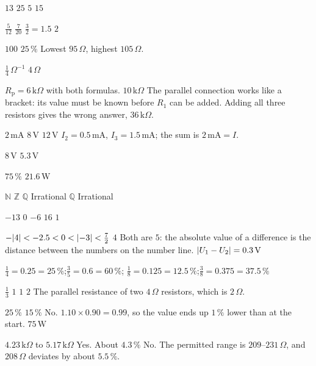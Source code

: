 
\begin{facit}

  $13$  $25$  $5$  $15$

  $\frac{5}{12}$  $\frac{7}{20}$  $\frac{3}{2} = 1.5$  $2$

  $100$  $25\,\%$  Lowest $95\,\Omega$, highest $105\,\Omega$.

  $\frac{1}{4}\,\Omega^{-1}$  $4\,\Omega$

  $R_{\text{p}} = 6\,\text{k}\Omega$ with both formulas.
 $10\,\text{k}\Omega$
 The parallel connection works like a bracket: its value must be known before $R_1$ can be
added. Adding all three resistors gives the wrong answer, $36\,\text{k}\Omega$.

  $2\,\text{mA}$  $8\,\text{V}$  $12\,\text{V}$
 $I_2 = 0.5\,\text{mA}$, $I_3 = 1.5\,\text{mA}$; the sum is $2\,\text{mA} = I$.

  $8\,\text{V}$  $5.3\,\text{V}$

  $75\,\%$  $21.6\,\text{W}$

  $\mathbb{N}$  $\mathbb{Z}$  $\mathbb{Q}$  Irrational
 $\mathbb{Q}$  Irrational

  $-13$  $0$  $-6$  $16$  $1$

  $-\lvert4\rvert < -2.5 < 0 < \lvert-3\rvert < \frac{7}{2}$  $4$
 Both are $5$: the absolute value of a difference is the distance between the numbers on the
number line.
 $\lvert U_1 - U_2\rvert = 0.3\,\text{V}$

 $\frac{1}{4} = 0.25 = 25\,\%$;\enspace $\frac{3}{5} = 0.6 = 60\,\%$;\enspace
$\frac{1}{8} = 0.125 = 12.5\,\%$;\enspace $\frac{3}{8} = 0.375 = 37.5\,\%$

  $\frac{1}{3}$  $1$  $1$  $2$
 The parallel resistance of two $4\,\Omega$ resistors, which is $2\,\Omega$.

  $25\,\%$  $15\,\%$
 No. $1.10 \times 0.90 = 0.99$, so the value ends up $1\,\%$ lower than at the start.
 $75\,\text{W}$

  $4.23\,\text{k}\Omega$ to $5.17\,\text{k}\Omega$  Yes.
 About $4.3\,\%$
 No. The permitted range is $209$--$231\,\Omega$, and $208\,\Omega$ deviates by about
$5.5\,\%$.


\end{facit}
